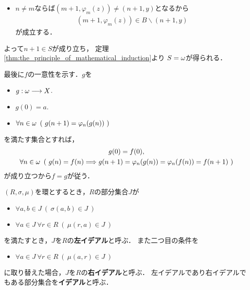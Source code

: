 \begin{prf}
\begin{description}
\begin{itemize}
					\item $n \neq m$ならば$(m+1,\varphi_m(z)) \neq (n+1,y)$となるから
						\begin{align}
							(m+1,\varphi_m(z)) \in B \backslash (n+1,y)
						\end{align}
						が成立する．
				\end{itemize}
				よって$n+1 \in S$が成り立ち，
				定理\ref{thm:the_principle_of_mathematical_induction}より
				$S = {\bf \omega}$が得られる．
		\end{description}
		最後に$f$の一意性を示す．$g$を
		\begin{itemize}
			\item $g:{\bf \omega} \longrightarrow X$.
			\item $g(0) = a$.
			\item $\forall n \in {\bf \omega}\ \left(\ g(n+1) = \varphi_n(g(n)) \ \right)$
		\end{itemize}
		を満たす集合とすれば，
		\begin{align}
			\begin{gathered}
				g(0) = f(0), \\
				\forall n \in \omg\ \left(\ g(n) = f(n) \Longrightarrow
				g(n+1) = \varphi_n(g(n)) = \varphi_n(f(n)) = f(n+1)\ \right)
			\end{gathered}
		\end{align}
		が成り立つから$f = g$が従う．
		\QED
	\end{prf}
	
	\begin{screen}
		\begin{dfn}[イデアル]
			$(R,\sigma,\mu)$を環とするとき，$R$の部分集合$J$が
			\begin{itemize}
				\item $\forall a,b \in J\ (\ \sigma(a,b) \in J\ )$
				\item $\forall a \in J\ \forall r \in R\ (\ \mu(r,a) \in J\ )$
			\end{itemize}
			を満たすとき，$J$を$R$の{\bf 左イデアル}と呼ぶ．
			また二つ目の条件を
			\begin{itemize}
				\item $\forall a \in J\ \forall r \in R\ (\ \mu(a,r) \in J\ )$
			\end{itemize}
			に取り替えた場合，$J$を$R$の{\bf 右イデアル}と呼ぶ．
			左イデアルであり右イデアルでもある部分集合を{\bf イデアル}と呼ぶ．
		\end{dfn}
	\end{screen}
	
